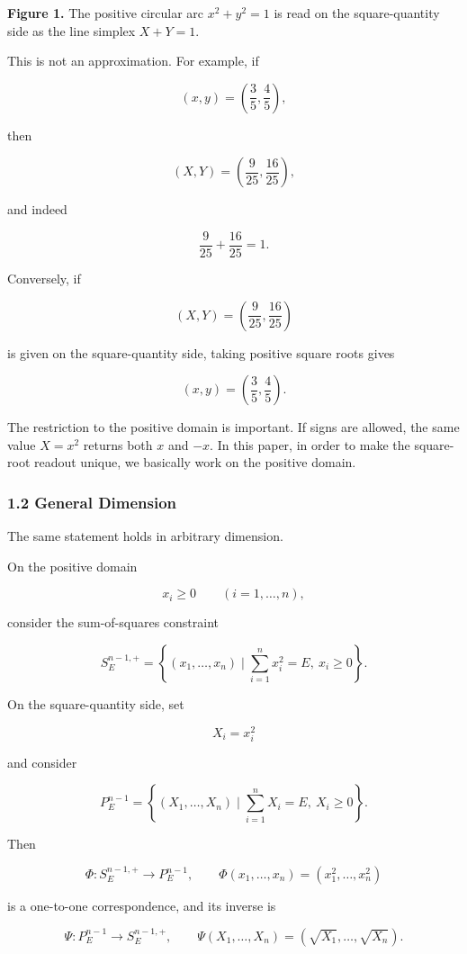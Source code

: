 \documentclass[
]{ltjsarticle}
\begin{document}
\textbf{Figure 1.} The positive circular arc \(x^2+y^2=1\) is read on
the square-quantity side as the line simplex \(X+Y=1\).

This is not an approximation. For example, if

\[
(x,y)=\left(\frac{3}{5},\frac{4}{5}\right),
\]

then

\[
(X,Y)=\left(\frac{9}{25},\frac{16}{25}\right),
\]

and indeed

\[
\frac{9}{25}+\frac{16}{25}=1.
\]

Conversely, if

\[
(X,Y)=\left(\frac{9}{25},\frac{16}{25}\right)
\]

is given on the square-quantity side, taking positive square roots gives

\[
(x,y)=\left(\frac{3}{5},\frac{4}{5}\right).
\]

The restriction to the positive domain is important. If signs are
allowed, the same value \(X=x^2\) returns both \(x\) and \(-x\). In this
paper, in order to make the square-root readout unique, we basically
work on the positive domain.

\subsubsection{1.2 General Dimension}\label{general-dimension}

The same statement holds in arbitrary dimension.

On the positive domain

\[
x_i\ge 0\qquad (i=1,\ldots,n),
\]

consider the sum-of-squares constraint

\[
S_E^{n-1,+}
=
\left\{
(x_1,\ldots,x_n)\mid \sum_{i=1}^{n}x_i^2=E,\ x_i\ge 0
\right\}.
\]

On the square-quantity side, set

\[
X_i=x_i^2
\]

and consider

\[
P_E^{n-1}
=
\left\{
(X_1,\ldots,X_n)\mid \sum_{i=1}^{n}X_i=E,\ X_i\ge 0
\right\}.
\]

Then

\[
\Phi:S_E^{n-1,+}\to P_E^{n-1},\qquad
\Phi(x_1,\ldots,x_n)=(x_1^2,\ldots,x_n^2)
\]

is a one-to-one correspondence, and its inverse is

\[
\Psi:P_E^{n-1}\to S_E^{n-1,+},\qquad
\Psi(X_1,\ldots,X_n)=(\sqrt{X_1},\ldots,\sqrt{X_n}).
\]
\end{document}
